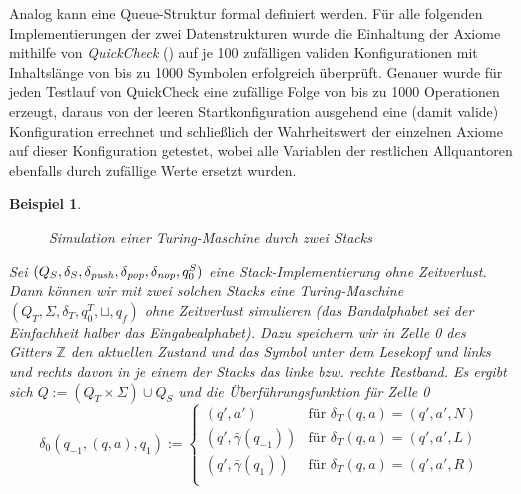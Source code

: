 \documentclass{article}
\newcounter{ctr}
\newtheorem{beispiel}[ctr]{Beispiel}
\begin{document}
Analog kann eine Queue-Struktur formal definiert werden. Für alle folgenden Implementierungen der zwei Datenstrukturen wurde die Einhaltung der Axiome mithilfe von \emph{QuickCheck} (\cite{hughes00}) auf je 100 zufälligen validen Konfigurationen mit Inhaltslänge von bis zu 1000 Symbolen erfolgreich überprüft. Genauer wurde für jeden Testlauf von QuickCheck eine zufällige Folge von bis zu 1000 Operationen erzeugt, daraus von der leeren Startkonfiguration ausgehend eine (damit valide) Konfiguration errechnet und schließlich der Wahrheitswert der einzelnen Axiome auf dieser Konfiguration getestet, wobei alle Variablen der restlichen Allquantoren ebenfalls durch zufällige Werte ersetzt wurden.

\begin{beispiel}
    \begin{figure}[h]
        \centering
        \caption{Simulation einer Turing-Maschine durch zwei Stacks}
    \end{figure}
    Sei $(Q_S, \delta_S, \delta_{\mathit{push}}, \delta_{\mathit{pop}}, \delta_{\mathit{nop}}, q^S_0)$ eine Stack-Implementierung ohne Zeitverlust. Dann können wir mit zwei solchen Stacks eine Turing-Maschine $(Q_T, \Sigma, \delta_T, q^T_0, \sqcup, q_f)$ ohne Zeitverlust simulieren (das Bandalphabet sei der Einfachheit halber das Eingabealphabet). Dazu speichern wir in Zelle 0 des Gitters $\mathbb{Z}$ den aktuellen Zustand und das Symbol unter dem Lesekopf und links und rechts davon in je einem der Stacks das linke bzw. rechte Restband. Es ergibt sich $Q := (Q_T \times \Sigma) \cup Q_S$ und die Überführungsfunktion für Zelle 0
    \[ \delta_0(q_{-1}, (q, a), q_1) :=
        \begin{cases}
            (q', a') &\text{für } \delta_T(q, a) = (q', a', N) \\
            (q', \bar\gamma(q_{-1})) &\text{für } \delta_T(q, a) = (q', a', L) \\
            (q', \bar\gamma(q_1)) &\text{für } \delta_T(q, a) = (q', a', R) \\
    \end{cases} \]

\end{beispiel}
\end{document}
